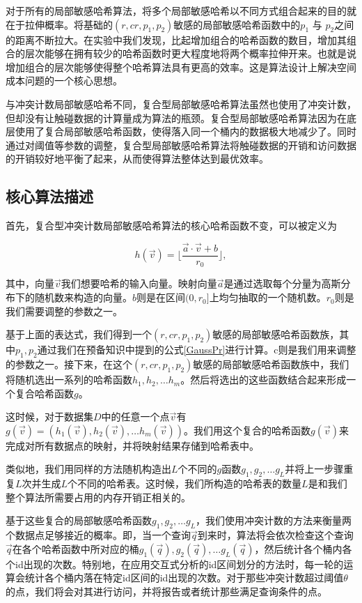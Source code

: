 对于所有的局部敏感哈希算法，将多个局部敏感哈希以不同方式组合起来的目的就在于拉伸概率。将基础的$ (r,cr,p_1,p_2) $敏感的局部敏感哈希函数中的$ p_1 $ 与 $ p_2 $之间的距离不断拉大。在实验中我们发现，比起增加组合的哈希函数的数目，增加其组合的层次能够在拥有较少的哈希函数时更大程度地将两个概率拉伸开来。也就是说增加组合的层次能够使得整个哈希算法具有更高的效率。这是算法设计上解决空间成本问题的一个核心思想。

与冲突计数局部敏感哈希不同，复合型局部敏感哈希算法虽然也使用了冲突计数，但却没有让触碰数据的计算量成为算法的瓶颈。复合型局部敏感哈希算法因为在底层使用了复合局部敏感哈希函数，使得落入同一个桶内的数据极大地减少了。同时通过对阈值等参数的调整，复合型局部敏感哈希算法将触碰数据的开销和访问数据的开销较好地平衡了起来，从而使得算法整体达到最优效率。


\subsection{核心算法描述}

首先，复合型冲突计数局部敏感哈希算法的核心哈希函数不变，可以被定义为

\begin{equation}
h(\vec{v}) = \lfloor \frac{\vec{a} \cdot \vec{v}+b}{r_0}\rfloor, 
\end{equation}

其中，向量$ \vec{v} $我们想要哈希的输入向量。映射向量$ \vec{a} $是通过选取每个分量为高斯分布下的随机数来构造的向量。$ b $则是在区间$ (0,r_0] $上均匀抽取的一个随机数。$ r_0 $则是我们需要调整的参数之一。


基于上面的表达式，我们得到一个$ (r,cr,p_1,p_2) $敏感的局部敏感哈希函数族，其中$ p_1,p_2 $通过我们在预备知识中提到的公式\ref{GaussPr}进行计算。c则是我们用来调整的参数之一。接下来，在这个$ (r,cr,p_1,p_2) $敏感的局部敏感哈希函数族中，我们将随机选出一系列的哈希函数$ h_1,h_2,\dots h_m $。然后将选出的这些函数结合起来形成一个复合哈希函数$ g $。

这时候，对于数据集$ D $中的任意一个点$ \vec{v} $有$ g(\vec{v}) = (h_1(\vec{v}),h_2(\vec{v}),\dots h_m(\vec{v})) $。我们用这个复合的哈希函数$ g(\vec{v}) $来完成对所有数据点的映射，并将映射结果存储到哈希表中。

类似地，我们用同样的方法随机构造出$ L $个不同的$ g $函数$ g_1,g_2,\dots g_L  $并将上一步骤重复$ L $次并生成$ L $个不同的哈希表。这时候，我们所构造的哈希表的数量$ L $是和我们整个算法所需要占用的内存开销正相关的。


基于这些复合的局部敏感哈希函数$ g_1,g_2,\dots g_L $，我们使用冲突计数的方法来衡量两个数据点足够接近的概率。即，当一个查询$ \vec{q} $到来时，算法将会依次检查这个查询$ \vec{q} $在各个哈希函数中所对应的桶$ g_1(\vec{q}),g_2(\vec{q}),\dots g_L(\vec{q}) $，然后统计各个桶内各个id出现的次数。特别地，在应用交互式分析的id区间划分的方法时，每一轮的运算会统计各个桶内落在特定id区间的id出现的次数。对于那些冲突计数超过阈值$ \theta $的点，我们将会对其进行访问，并将报告或者统计那些满足查询条件的点。

